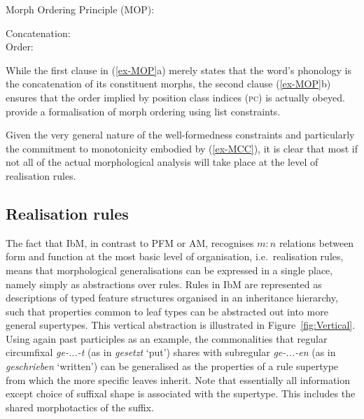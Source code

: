 \documentclass[output=paper,biblatex,babelshorthands,newtxmath,draftmode,colorlinks,citecolor=brown]{langscibook}
\begin{document}
\begin{exe}
\begin{xlist}
\begin{exe}
  \ex\label{ex-MOP}
Morph Ordering Principle (MOP):
\begin{xlist}
\ex Concatenation:\\
\ex Order:\\
\zl

While the first clause in (\ref{ex-MOP}a) merely states that the
word's phonology is the concatenation of its constituent morphs, the
second clause (\ref{ex-MOP}b) ensures that the order implied by position class indices
(\textsc{pc}) is actually obeyed. \citet{bonami_o-crysmann_b13hpsg}
provide a formalisation of morph ordering using list constraints.


Given the very general nature of the well-formedness constraints and
particularly the commitment to monotonicity embodied by
(\ref{ex-MCC}), it is clear that most if not all of the actual
morphological analysis will take place at the level of realisation
rules.


\subsection{Realisation rules}

\enlargethispage{4pt}
The fact that IbM, in contrast to PFM or AM, recognises $m:n$
relations between form and function at the most basic level of
organisation, i.e.\ realisation rules, means that morphological
generalisations can be expressed in a single place, name\-ly simply as
abstractions over rules. Rules in IbM are represented as descriptions
of typed feature structures organised in an inheritance hierarchy,
such that properties common to leaf types can be abstracted out into
more general supertypes. This vertical abstraction is illustrated in
Figure~\ref{fig:Vertical}. Using again  past participles as an
example, the commonalities that regular circumfixal \textit{ge-...-t}
(as in \textit{gesetzt} `put') shares with subregular
\textit{ge-...-en} (as in \textit{geschrieben} `written') can be
generalised as the properties of a rule supertype from which the more
specific leaves inherit. Note that essentially all information except
choice of suffixal shape is associated with the supertype. This
includes the shared morphotactics of the suffix.


\end{xlist}
\end{exe}
\end{xlist}
\end{exe}
\end{document}
